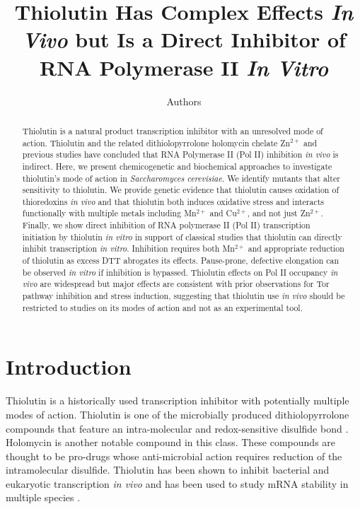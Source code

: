 \documentclass[11pt]{article}
\title{Thiolutin Has Complex Effects \textit{In Vivo} but Is a Direct Inhibitor of RNA Polymerase II \textit{In Vitro}}
\author{Authors}
\date{}
\begin{document}
\maketitle

\begin{abstract}
Thiolutin is a natural product transcription inhibitor with an unresolved mode of action. Thiolutin and the related dithiolopyrrolone holomycin chelate Zn$^{2+}$ and previous studies have concluded that RNA Polymerase II (Pol II) inhibition \textit{in vivo} is indirect. Here, we present chemicogenetic and biochemical approaches to investigate thiolutin's mode of action in \textit{Saccharomyces cerevisiae}. We identify mutants that alter sensitivity to thiolutin. We provide genetic evidence that thiolutin causes oxidation of thioredoxins \textit{in vivo} and that thiolutin both induces oxidative stress and interacts functionally with multiple metals including Mn$^{2+}$ and Cu$^{2+}$, and not just Zn$^{2+}$. Finally, we show direct inhibition of RNA polymerase II (Pol II) transcription initiation by thiolutin \textit{in vitro} in support of classical studies that thiolutin can directly inhibit transcription \textit{in vitro}. Inhibition requires both Mn$^{2+}$ and appropriate reduction of thiolutin as excess DTT abrogates its effects. Pause-prone, defective elongation can be observed \textit{in vitro} if inhibition is bypassed. Thiolutin effects on Pol II occupancy \textit{in vivo} are widespread but major effects are consistent with prior observations for Tor pathway inhibition and stress induction, suggesting that thiolutin use \textit{in vivo} should be restricted to studies on its modes of action and not as an experimental tool.
\end{abstract}

\section{Introduction}

Thiolutin is a historically used transcription inhibitor with potentially multiple modes of action. Thiolutin is one of the microbially produced dithiolopyrrolone compounds that feature an intra-molecular and redox-sensitive disulfide bond \citep{Tipper1973,Oliva2001}. Holomycin is another notable compound in this class. These compounds are thought to be pro-drugs whose anti-microbial action requires reduction of the intramolecular disulfide. Thiolutin has been shown to inhibit bacterial and eukaryotic transcription \textit{in vivo} and has been used to study mRNA stability in multiple species \citep{Jimenez1973,Parker1991,Grigull2004,Pelechano2010}.
\end{document}
